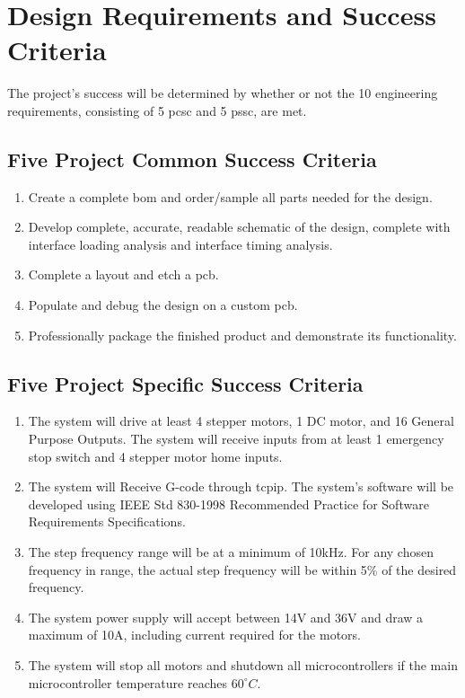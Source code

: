 \chapter{Design Requirements and Success Criteria}
The project's success will be determined by whether or not the 10 engineering requirements, consisting of 5 \gls{pcsc} and 5 \gls{pssc}, are met. 

\section{Five Project Common Success Criteria}
\begin{enumerate}
	\item Create a complete \gls{bom} and order/sample all parts needed for the design.
	\item Develop complete, accurate, readable schematic of the design, complete with interface loading analysis and interface timing analysis. 
	\item Complete a layout and etch a \gls{pcb}.
	\item Populate and debug the design on a custom \gls{pcb}.
	\item Professionally package the finished product and demonstrate its functionality.
\end{enumerate}

\section{Five Project Specific Success Criteria}
\label{sec:psscs}
\begin{enumerate}
	\item The system will drive at least 4 stepper motors, 1 DC motor, and 16 General Purpose Outputs.
The system will receive inputs from at least 1 emergency stop switch and 4 stepper motor home inputs.
	\item The system will Receive G-code through \gls{tcpip}.
The system’s software will be developed using IEEE Std 830-1998 Recommended Practice for Software Requirements Specifications.
	\item The step frequency range will be at a minimum of 10kHz.
For any chosen frequency in range, the actual step frequency will be within 5\% of the desired frequency.
	\item The system power supply will accept between 14V and 36V and draw a maximum of 10A, including current required for the motors. 
	\item The system will stop all motors and shutdown all microcontrollers if the main microcontroller temperature reaches $60^{\circ}C$.
\end{enumerate}

